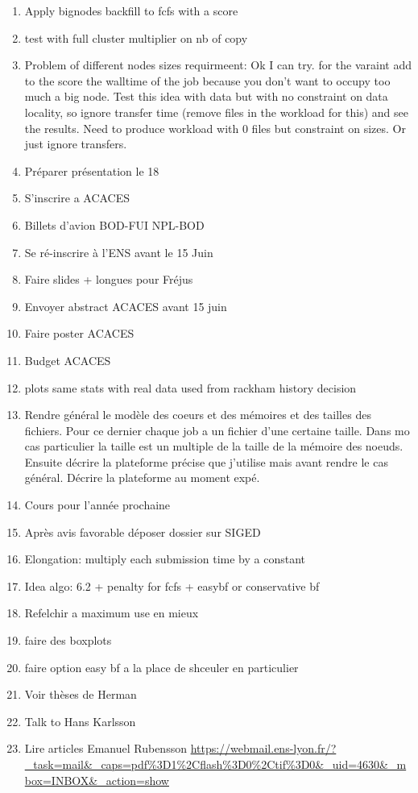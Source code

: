 \documentclass[a4paper]{article}
\begin{document}
\begin{enumerate}
			\item Apply bignodes backfill to fcfs with a score
			\item test with full cluster multiplier on nb of copy
			\item Problem of different nodes sizes requirmeent: Ok I can try. for the varaint add to the score the walltime of the job because you don't want to occupy too much a big node. Test this idea with data but with no constraint on data locality, so ignore transfer time (remove files in the workload for this) and see the results. Need to produce workload with 0 files but constraint on sizes. Or just ignore transfers.
			\item Préparer présentation le 18
			\item S'inscrire a ACACES
			\item Billets d'avion BOD-FUI NPL-BOD
			\item Se ré-inscrire à l'ENS avant le 15 Juin
			\item Faire slides + longues pour Fréjus
			\item Envoyer abstract ACACES avant 15 juin
			\item Faire poster ACACES
			\item Budget ACACES
			\item plots same stats with real data used from rackham history decision
			\item Rendre général le modèle des coeurs et des mémoires et des tailles des fichiers. Pour ce dernier chaque job a un fichier d'une certaine taille. Dans mo cas particulier la taille est un multiple de la taille de la mémoire des noeuds. Ensuite décrire la plateforme précise que j'utilise mais avant rendre le cas général. Décrire la plateforme au moment expé.
			\item Cours pour l'année prochaine
			\item Après avis favorable déposer dossier sur SIGED
			\item Elongation: multiply each submission time by a constant
			\item Idea algo: 6.2 + penalty for fcfs + easybf or conservative bf
			\item Refelchir a maximum use en mieux
			\item faire des boxplots
			\item faire option easy bf a la place de shceuler en particulier
			\item Voir thèses de Herman
			\item Talk to Hans Karlsson
			\item Lire articles Emanuel Rubensson \url{https://webmail.ens-lyon.fr/?_task=mail&_caps=pdf%3D1%2Cflash%3D0%2Ctif%3D0&_uid=4630&_mbox=INBOX&_action=show}

\end{enumerate}
\end{document}
